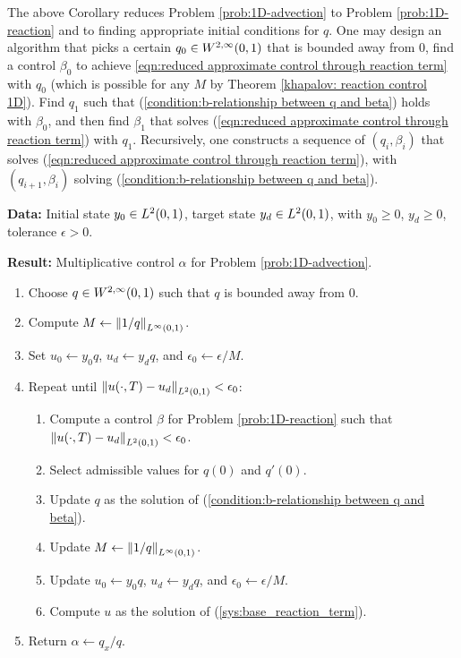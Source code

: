 \documentclass{ifacconf}
\begin{document}
The above Corollary reduces Problem \ref{prob:1D-advection} to Problem \ref{prob:1D-reaction} and to finding appropriate initial conditions for $q$. One may design an algorithm that picks a certain $q_0 \in {W^{2,\infty}_{}{\left ( 0,1 \right )}}$ that is bounded away from $0$, find a control $\beta_0$ to achieve \eqref{eqn:reduced approximate control through reaction term} with $q_0$ (which is possible for any $M$ by Theorem \ref{khapalov: reaction control 1D}). Find $q_1$ such that (\ref{condition:b-relationship between q and beta}) holds with $\beta_0$, and then find $\beta_1$ that solves (\ref{eqn:reduced approximate control through reaction term}) with $q_1$. Recursively, one constructs a sequence of $(q_i, \beta_i)$ that solves (\ref{eqn:reduced approximate control through reaction term}), with $(q_{i+1}, \beta_i)$ solving (\ref{condition:b-relationship between q and beta}).


\begin{algorithm}[h]
\label{alg:recursive control}

\textbf{Data:}
Initial state $y_0 \in {L^{2}_{}{\left ( 0,1 \right )}}$, target state $y_d \in {L^{2}_{}{\left ( 0,1 \right )}}$,
with $y_0 \ge 0$, $y_d \ge 0$, tolerance $\epsilon > 0$.

\textbf{Result:}
Multiplicative control $\alpha$ for Problem \ref{prob:1D-advection}.

\begin{enumerate}[label=\arabic*.]
\item Choose $q \in {W^{2,\infty}_{}{\left ( 0,1 \right )}}$ such that $q$ is bounded away from $0$.
\item Compute $M \gets {\left\| 1/q\right\|}_{{L^{\infty}_{}{\left ( 0,1 \right )}}}$.
\item Set $u_0 \gets y_0 q$, $u_d \gets y_d q$, and $\epsilon_0 \gets \epsilon / M$.

\item Repeat until ${\left\| u(\cdot,T) - u_d\right\|}_{{L^{2}_{}{\left ( 0,1 \right )}}} < \epsilon_0$:
  \begin{enumerate}[label=\roman*.]
  \item Compute a control $\beta$ for Problem \ref{prob:1D-reaction} such that
  ${\left\| u(\cdot,T) - u_d\right\|}_{{L^{2}_{}{\left ( 0,1 \right )}}} < \epsilon_0$.
  \item Select admissible values for $q(0)$ and $q'(0)$.
  \item Update $q$ as the solution of
  (\ref{condition:b-relationship between q and beta}).
  \item Update $M \gets {\left\| 1/q\right\|}_{{L^{\infty}_{}{\left ( 0,1 \right )}}}$.
  \item Update $u_0 \gets y_0 q$, $u_d \gets y_d q$, and
  $\epsilon_0 \gets \epsilon / M$.
  \item Compute $u$ as the solution of
  (\ref{sys:base_reaction_term}).
  \end{enumerate}

\item Return $\alpha \gets q_x / q$.
\end{enumerate}

\end{algorithm}
\end{document}
